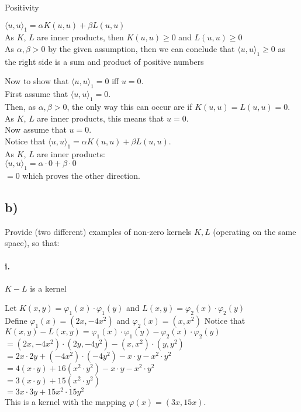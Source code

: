 \documentclass[12pt]{article}
\newcommand\tab[1][1cm]{\hspace*{#1}}
\begin{document}
\tab Positivity

$ \langle u, u \rangle_1 = \alpha K(u, u) + \beta L(u, u) $ \\
As $K$, $L$ are inner products, then $K(u, u) \geq 0$ and $L(u, u) \geq 0$ \\
As $\alpha,\beta > 0$ by the given assumption, then we can conclude that $ \langle u, u \rangle_1 \geq 0 $ as the right side is a sum and product of positive  numbers 

Now to show that $ \langle u, u \rangle_1 = 0 $ iff $ u = 0 $. \\
First assume that $ \langle u, u \rangle_1 = 0 $. \\
Then, as $\alpha,\beta > 0$, the only way this can occur are if $ K(u, u) = L(u, u) = 0 $. \\ 
As $K$, $L$ are inner products, this means that $ u = 0$. \\
Now assume that $ u = 0 $. \\
Notice that $ \langle u, u \rangle_1 = \alpha K(u, u) + \beta L(u, u) $. \\
As $K$, $L$ are inner products: \\
$ \langle u, u \rangle_1 = \alpha \cdot 0 + \beta \cdot 0 $ \\
$ = 0 $ which proves the other direction.
		
\subsection*{b)}

Provide (two different) examples of non-zero kernels $K,L$ (operating on the same space), so that:

\paragraph{\tab i.}

$K - L$ is a kernel

Let $K(x,y) = \varphi_1(x)\cdot\varphi_1(y)$ and $L(x,y) = \varphi_2(x)\cdot\varphi_2(y)$ \\
			Define $\varphi_1(x) = (2x, -4x^2)$ and $\varphi_2(x) = (x, x^2) $
			Notice that $ K(x,y) - L(x,y) = \varphi_1(x)\cdot\varphi_1(y) - \varphi_2(x)\cdot\varphi_2(y) $ \\
			$ = (2x, -4x^2)\cdot(2y, -4y^2) - (x, x^2)\cdot(y,y^2) $ \\
			$ = 2x \cdot 2y + (-4x^2) \cdot (-4y^2) - x \cdot y - x^2 \cdot y^2 $ \\
			$ = 4(x \cdot y) + 16(x^2 \cdot y^2) - x \cdot y - x^2 \cdot y^2 $ \\
			$ = 3(x \cdot y) + 15(x^2 \cdot y^2) $ \\
			$ = 3x \cdot 3y + 15x^2 \cdot 15y^2 $ \\
			This is a kernel with the mapping $ \varphi(x) = (3x, 15x) $.
\end{document}
